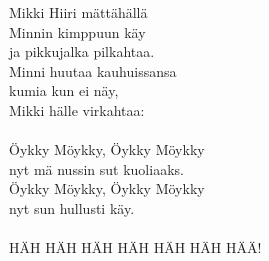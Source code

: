 
            Mikki Hiiri mättähällä \\
            Minnin kimppuun käy \\
            ja pikkujalka pilkahtaa. \\
            Minni huutaa kauhuissansa \\
            kumia kun ei näy, \\
            Mikki hälle virkahtaa: \\
\hspace{10mm} \\
            Öykky Möykky, Öykky Möykky \\
            nyt mä nussin sut kuoliaaks. \\
            Öykky Möykky, Öykky Möykky \\
            nyt sun hullusti käy. \\
\hspace{10mm} \\
            HÄH HÄH HÄH HÄH HÄH HÄH HÄÄ! \\
